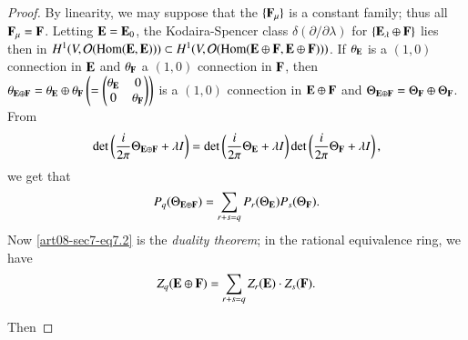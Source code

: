\begin{proof}
By linearity, we may suppose that the $\{\mathbf{F}_{\mu}\}$ is a constant family; thus all $\mathbf{F}_{\mu}=\mathbf{F}$. Letting $\mathbf{E}=\mathbf{E}_{0}$, the Kodaira-Spencer class $\delta(\partial/\partial \lambda)$ for $\{\mathbf{E}_{\lambda}\oplus \mathbf{F}\}$ lies then in $H^{1}(V,\mathcal{O}(\operatorname{\mathrm{Hom}}(\mathbf{E},\mathbf{E})))\subset H^{1}(V,\mathcal{O}(\operatorname{\mathrm{Hom}}(\mathbf{E}\oplus \mathbf{F},\mathbf{E}\oplus \mathbf{F})))$. If $\theta_{\mathbf{E}}$ is a $(1,0)$ connection in $\mathbf{E}$ and $\theta_{\mathbf{F}}$ a $(1,0)$ connection in $\mathbf{F}$, then $\theta_{\mathbf{E}\oplus \mathbf{F}}=\theta_{\mathbf{E}}\oplus \theta_{\mathbf{F}}\left(=\left(\begin{matrix} \theta_{\mathbf{E}} & 0\\ 0 &\theta_{\mathbf{F}}\end{matrix}\right)\right)$ is a $(1,0)$ connection in $\mathbf{E}\oplus\mathbf{F}$ and $\Theta_{\mathbf{E}\oplus\mathbf{F}}=\Theta_{\mathbf{F}}\oplus\Theta_{\mathbf{F}}$. From
$$
\det \left(\dfrac{i}{2\pi}\Theta_{\mathbf{E}\oplus\mathbf{F}}+\lambda I\right)=\det \left(\dfrac{i}{2\pi}\Theta_{\mathbf{E}}+\lambda I\right)\det \left(\dfrac{i}{2\pi}\Theta_{\mathbf{F}}+\lambda I\right),
$$
we get that
\begin{equation}
P_{q}(\Theta_{\mathbf{E}\oplus \mathbf{F}})=\sum\limits_{r+s=q}P_{r}(\Theta_{\mathbf{E}})P_{s}(\Theta_{\mathbf{F}}).\label{art08-sec7-eq7.2}
\end{equation}
Now \eqref{art08-sec7-eq7.2} is the {\em duality theorem}; in the rational equivalence ring, we have 
\begin{equation}
Z_{q}(\mathbf{E}\oplus \mathbf{F})=\sum\limits_{r+s=q}Z_{r}(\mathbf{E})\cdot Z_{s}(\mathbf{F}).\label{art08-sec7-eq7.3}
\end{equation}

Then\pageoriginale %
\end{proof}
